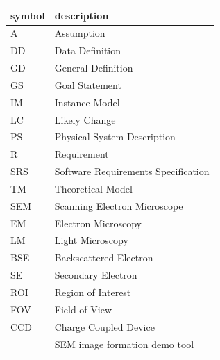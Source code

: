 \documentclass[12pt]{article}
\begin{document}
\renewcommand{\arraystretch}{1.2}
\begin{tabular}{l l} 
  \toprule		
  \textbf{symbol} & \textbf{description}\\
  \midrule 
  A & Assumption\\
  DD & Data Definition\\
  GD & General Definition\\
  GS & Goal Statement\\
  IM & Instance Model\\
  LC & Likely Change\\
  PS & Physical System Description\\
  R & Requirement\\
  SRS & Software Requirements Specification\\
  TM & Theoretical Model\\
  SEM & Scanning Electron Microscope\\
  EM & Electron Microscopy\\
  LM & Light Microscopy\\
  BSE & Backscattered Electron\\
  SE & Secondary Electron\\
  ROI & Region of Interest\\
  FOV & Field of View\\
  CCD & Charge Coupled Device\\
  \progname{} & SEM image formation demo tool\\
  \bottomrule
\end{tabular}\\



\end{document}
